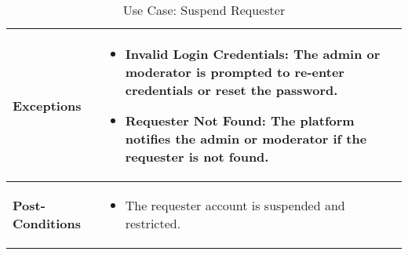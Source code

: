 \begin{table}[!ht]
\begin{tabularx}{\textwidth}{|l|X|}
        \hline
        \textbf{Exceptions} & 
        \begin{itemize}[label=--,itemsep=0pt]
            \item Invalid Login Credentials: The admin or moderator is prompted to re-enter credentials or reset the password.
            \item Requester Not Found: The platform notifies the admin or moderator if the requester is not found.
        \end{itemize} \\
        \hline
        \textbf{Post-Conditions} & 
        \begin{itemize}[label=--,itemsep=0pt]
            \item The requester account is suspended and restricted.
        \end{itemize} \\
        \hline
    \end{tabularx}
    \caption{Use Case: Suspend Requester}
    \label{tab:use-case-suspend-requester}
\end{table}


